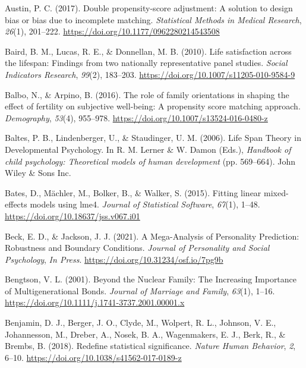 \documentclass[
  english,
  man, noextraspace]{apa7}
\begin{document}
\leavevmode\hypertarget{ref-austinDoublePropensityscoreAdjustment2017}{}%
Austin, P. C. (2017). Double propensity-score adjustment: A solution to design bias or bias due to incomplete matching. \emph{Statistical Methods in Medical Research}, \emph{26}(1), 201--222. \url{https://doi.org/10.1177/0962280214543508}

\leavevmode\hypertarget{ref-bairdLifeSatisfactionLifespan2010}{}%
Baird, B. M., Lucas, R. E., \& Donnellan, M. B. (2010). Life satisfaction across the lifespan: Findings from two nationally representative panel studies. \emph{Social Indicators Research}, \emph{99}(2), 183--203. \url{https://doi.org/10.1007/s11205-010-9584-9}

\leavevmode\hypertarget{ref-balboRoleFamilyOrientations2016}{}%
Balbo, N., \& Arpino, B. (2016). The role of family orientations in shaping the effect of fertility on subjective well-being: A propensity score matching approach. \emph{Demography}, \emph{53}(4), 955--978. \url{https://doi.org/10.1007/s13524-016-0480-z}

\leavevmode\hypertarget{ref-baltesLifeSpanTheory2006}{}%
Baltes, P. B., Lindenberger, U., \& Staudinger, U. M. (2006). Life Span Theory in Developmental Psychology. In R. M. Lerner \& W. Damon (Eds.), \emph{Handbook of child psychology: Theoretical models of human development} (pp. 569--664). John Wiley \& Sons Inc.

\leavevmode\hypertarget{ref-R-lme4}{}%
Bates, D., Mächler, M., Bolker, B., \& Walker, S. (2015). Fitting linear mixed-effects models using lme4. \emph{Journal of Statistical Software}, \emph{67}(1), 1--48. \url{https://doi.org/10.18637/jss.v067.i01}

\leavevmode\hypertarget{ref-beckMegaAnalysisPersonalityPrediction2021}{}%
Beck, E. D., \& Jackson, J. J. (2021). A Mega-Analysis of Personality Prediction: Robustness and Boundary Conditions. \emph{Journal of Personality and Social Psychology}, \emph{In Press}. \url{https://doi.org/10.31234/osf.io/7pg9b}

\leavevmode\hypertarget{ref-bengtsonNuclearFamilyIncreasing2001}{}%
Bengtson, V. L. (2001). Beyond the Nuclear Family: The Increasing Importance of Multigenerational Bonds. \emph{Journal of Marriage and Family}, \emph{63}(1), 1--16. \url{https://doi.org/10.1111/j.1741-3737.2001.00001.x}

\leavevmode\hypertarget{ref-benjaminRedefineStatisticalSignificance2018}{}%
Benjamin, D. J., Berger, J. O., Clyde, M., Wolpert, R. L., Johnson, V. E., Johannesson, M., Dreber, A., Nosek, B. A., Wagenmakers, E. J., Berk, R., \& Brembs, B. (2018). Redefine statistical significance. \emph{Nature Human Behavior}, \emph{2}, 6--10. \url{https://doi.org/10.1038/s41562-017-0189-z}
\end{document}
